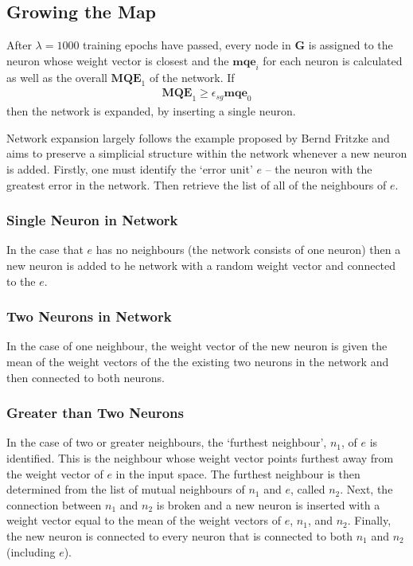 \documentclass{report}
\begin{document}
\subsection{Growing the Map}
After $\lambda=1000$ training epochs have passed, every node in $\textbf{G}$ is assigned to the neuron whose weight vector is closest and the $\textbf{mqe}_i$ for each neuron is calculated as well as the overall $\textbf{MQE}_1$ of the network. If 
\begin{align*}
\textbf{MQE}_1 \geq \epsilon_{sg} \textbf{mqe}_0
\end{align*}
then the network is expanded, by inserting a single neuron.

Network expansion largely follows the example proposed by Bernd Fritzke \cite{fritzke1994growing} and aims to preserve a simplicial structure within the network whenever a new neuron is added. Firstly, one must identify the `error unit' $e$ -- the neuron with the greatest error in the network. Then retrieve the list of all of the neighbours of $e$.

\subsubsection{Single Neuron in Network}
In the case that $e$ has no neighbours (the network consists of one neuron) then a new neuron is added to he network with a random weight vector and connected to the $e$. 

\subsubsection{Two Neurons in Network}
In the case of one neighbour, the weight vector of the new neuron is given the mean of the weight vectors of the the existing two neurons in the network and then connected to both neurons. 

\subsubsection{Greater than Two Neurons}
In the case of two or greater neighbours, the `furthest neighbour', $n_1$, of $e$ is identified. This is the neighbour whose weight vector points furthest away from the weight vector of $e$ in the input space. The furthest neighbour is then determined from the list of mutual neighbours of $n_1$ and $e$, called $n_2$. Next, the connection between $n_1$ and $n_2$ is broken and a new neuron is inserted with a weight vector equal to the mean of the weight vectors of $e$, $n_1$, and $n_2$. Finally, the new neuron is connected to every neuron that is connected to both $n_1$ and $n_2$ (including $e$).
\end{document}
